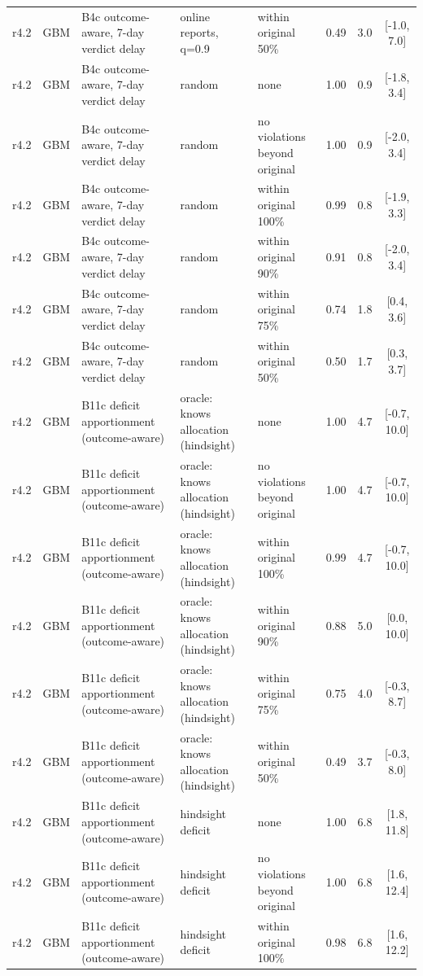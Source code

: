 \begin{longtable}{lllp{4.2cm}p{3.4cm}ccc}
r4.2 & GBM & B4c outcome-aware, 7-day verdict delay & online reports, q=0.9 & within original 50\% & 0.49 & 3.0 & [-1.0, 7.0] \\
r4.2 & GBM & B4c outcome-aware, 7-day verdict delay & random & none & 1.00 & 0.9 & [-1.8, 3.4] \\
r4.2 & GBM & B4c outcome-aware, 7-day verdict delay & random & no violations beyond original & 1.00 & 0.9 & [-2.0, 3.4] \\
r4.2 & GBM & B4c outcome-aware, 7-day verdict delay & random & within original 100\% & 0.99 & 0.8 & [-1.9, 3.3] \\
r4.2 & GBM & B4c outcome-aware, 7-day verdict delay & random & within original 90\% & 0.91 & 0.8 & [-2.0, 3.4] \\
r4.2 & GBM & B4c outcome-aware, 7-day verdict delay & random & within original 75\% & 0.74 & 1.8 & [0.4, 3.6] \\
r4.2 & GBM & B4c outcome-aware, 7-day verdict delay & random & within original 50\% & 0.50 & 1.7 & [0.3, 3.7] \\
r4.2 & GBM & B11c deficit apportionment (outcome-aware) & oracle: knows allocation (hindsight) & none & 1.00 & 4.7 & [-0.7, 10.0] \\
r4.2 & GBM & B11c deficit apportionment (outcome-aware) & oracle: knows allocation (hindsight) & no violations beyond original & 1.00 & 4.7 & [-0.7, 10.0] \\
r4.2 & GBM & B11c deficit apportionment (outcome-aware) & oracle: knows allocation (hindsight) & within original 100\% & 0.99 & 4.7 & [-0.7, 10.0] \\
r4.2 & GBM & B11c deficit apportionment (outcome-aware) & oracle: knows allocation (hindsight) & within original 90\% & 0.88 & 5.0 & [0.0, 10.0] \\
r4.2 & GBM & B11c deficit apportionment (outcome-aware) & oracle: knows allocation (hindsight) & within original 75\% & 0.75 & 4.0 & [-0.3, 8.7] \\
r4.2 & GBM & B11c deficit apportionment (outcome-aware) & oracle: knows allocation (hindsight) & within original 50\% & 0.49 & 3.7 & [-0.3, 8.0] \\
r4.2 & GBM & B11c deficit apportionment (outcome-aware) & hindsight deficit & none & 1.00 & 6.8 & [1.8, 11.8] \\
r4.2 & GBM & B11c deficit apportionment (outcome-aware) & hindsight deficit & no violations beyond original & 1.00 & 6.8 & [1.6, 12.4] \\
r4.2 & GBM & B11c deficit apportionment (outcome-aware) & hindsight deficit & within original 100\% & 0.98 & 6.8 & [1.6, 12.2] \\

\end{longtable}

